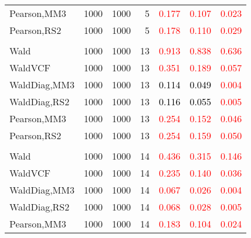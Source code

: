 \documentclass[
]{article}
\begin{document}
\begin{table}[H]
{\begin{tabular}[t]{lrrrrrr}
\hspace{1em}Pearson,MM3 & 1000 & 1000 & 5 & \textcolor{red}{0.177} & \textcolor{red}{0.107} & \textcolor{red}{0.023}\\
\hspace{1em}Pearson,RS2 & 1000 & 1000 & 5 & \textcolor{red}{0.178} & \textcolor{red}{0.110} & \textcolor{red}{0.029}\\
\addlinespace[0.3em]
\multicolumn{7}{l}{\textbf{1F 15V}}\\
\hspace{1em}Wald & 1000 & 1000 & 13 & \textcolor{red}{0.913} & \textcolor{red}{0.838} & \textcolor{red}{0.636}\\
\hspace{1em}WaldVCF & 1000 & 1000 & 13 & \textcolor{red}{0.351} & \textcolor{red}{0.189} & \textcolor{red}{0.057}\\
\hspace{1em}WaldDiag,MM3 & 1000 & 1000 & 13 & \textcolor{black}{0.114} & \textcolor{black}{0.049} & \textcolor{red}{0.004}\\
\hspace{1em}WaldDiag,RS2 & 1000 & 1000 & 13 & \textcolor{black}{0.116} & \textcolor{black}{0.055} & \textcolor{red}{0.005}\\
\hspace{1em}Pearson,MM3 & 1000 & 1000 & 13 & \textcolor{red}{0.254} & \textcolor{red}{0.152} & \textcolor{red}{0.046}\\
\hspace{1em}Pearson,RS2 & 1000 & 1000 & 13 & \textcolor{red}{0.254} & \textcolor{red}{0.159} & \textcolor{red}{0.050}\\
\addlinespace[0.3em]
\multicolumn{7}{l}{\textbf{2F 10V}}\\
\hspace{1em}Wald & 1000 & 1000 & 14 & \textcolor{red}{0.436} & \textcolor{red}{0.315} & \textcolor{red}{0.146}\\
\hspace{1em}WaldVCF & 1000 & 1000 & 14 & \textcolor{red}{0.235} & \textcolor{red}{0.140} & \textcolor{red}{0.036}\\
\hspace{1em}WaldDiag,MM3 & 1000 & 1000 & 14 & \textcolor{red}{0.067} & \textcolor{red}{0.026} & \textcolor{red}{0.004}\\
\hspace{1em}WaldDiag,RS2 & 1000 & 1000 & 14 & \textcolor{red}{0.068} & \textcolor{red}{0.028} & \textcolor{red}{0.005}\\
\hspace{1em}Pearson,MM3 & 1000 & 1000 & 14 & \textcolor{red}{0.183} & \textcolor{red}{0.104} & \textcolor{red}{0.024}\\

\end{tabular}}
\end{table}
\end{document}
